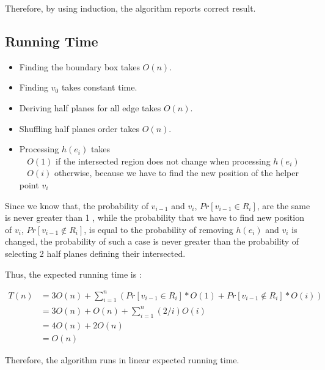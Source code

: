 \documentclass[12pt]{article}
\begin{document}
Therefore, by using induction, the algorithm reports correct result.

\subsection*{Running Time}
\begin{itemize}
    \item Finding the boundary box takes $O(n)$.
    \item Finding $v_0$  takes constant time.
    \item Deriving half planes for all edge takes $O(n)$.
    \item Shuffling half planes order takes $O(n)$.
    \item Processing $h(e_i)$ takes \\
    $\;\;$ $O(1)$ if the intersected region does not change when processing $h(e_i)$\\
    $\;\;$ $O(i)$ otherwise, because we have to find the new position of the helper point $v_i$
\end{itemize}
Since we know that, the probability of $v_{i-1}$ and $v_i$, $Pr[v_{i-1} \in R_i]$, are the same is never greater than 1
, while the probability that we have to find new position of $v_i$, $Pr[v_{i-1} \notin R_i]$, is equal to the probability
of removing $h(e_i)$ and $v_i$ is changed, the probability of such a case is never
greater than the probability of selecting 2 half planes defining their intersected.

Thus, the expected running time is :

\begin{align*}
    T(n) &= 3O(n) + \sum_{i=1}^{n}( Pr[v_{i-1} \in R_i]*O(1) + Pr[v_{i-1} \notin R_i]*O(i) ) \\
         &= 3O(n) + O(n) + \sum_{i=1}^{n}(2/i)O(i) \\
         &= 4O(n) + 2O(n) \\
         &= O(n)
\end{align*}

Therefore, the algorithm runs in linear expected running time.
\end{document}

